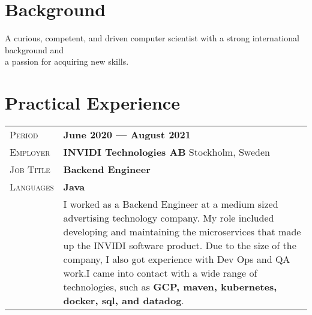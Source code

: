 \documentclass[a4paper, oneside, final]{scrartcl} %
\newcommand{\gray}{\rowcolor[gray]{.90}} %
\begin{document}
\begin{center} %


{\fontsize{36}{36}\selectfont\scshape{}} %

\vspace{1.5cm} %


\section{Background}

A curious, competent, and driven computer scientist with a strong international background and \\ a passion for acquiring new skills.


\section{Practical Experience}

\begin{tabularx}{0.97\linewidth}{>{\raggedleft\scshape}p{2cm}X}
\gray Period & \textbf{June 2020 --- August 2021}\\
\gray Employer & \textbf{INVIDI Technologies AB} \hfill Stockholm, Sweden\\
\gray Job Title & \textbf{Backend Engineer}\\
\gray Languages & \textbf{Java}\\
       & I worked as a Backend Engineer at a medium sized advertising technology company. My role included developing and maintaining the microservices that made up the INVIDI software product. Due to the size of the company, I also got experience with Dev Ops and QA work.I came into contact with a wide range of technologies, such as \textbf{GCP, maven, kubernetes, docker, sql, and datadog}.
\end{tabularx}


\end{center}
\end{document}
